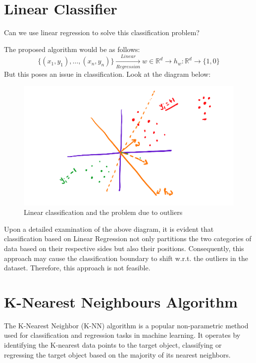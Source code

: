 \documentclass[
]{article}
\begin{document}
\hypertarget{linear-classifier}{%
\section{Linear Classifier}\label{linear-classifier}}

Can we use linear regression to solve this classification problem?

The proposed algorithm would be as follows: \[
\{(x_1, y_1), \ldots, (x_n,y_n)\} \xrightarrow[Regression]{Linear} w \in \mathbb{R}^d\rightarrow h_w: \mathbb{R}^d \rightarrow \{1, 0\}
\] But this poses an issue in classification. Look at the diagram below:

\begin{figure}
\centering
\includegraphics{./images/lin_class.png}
\caption{Linear classification and the problem due to outliers}
\end{figure}

Upon a detailed examination of the above diagram, it is evident that
classification based on Linear Regression not only partitions the two
categories of data based on their respective sides but also their
positions. Consequently, this approach may cause the classification
boundary to shift w.r.t. the outliers in the dataset. Therefore, this
approach is not feasible.

\hypertarget{k-nearest-neighbours-algorithm}{%
\section{K-Nearest Neighbours
Algorithm}\label{k-nearest-neighbours-algorithm}}

The K-Nearest Neighbor (K-NN) algorithm is a popular non-parametric
method used for classification and regression tasks in machine learning.
It operates by identifying the K-nearest data points to the target
object, classifying or regressing the target object based on the
majority of its nearest neighbors.
\end{document}
